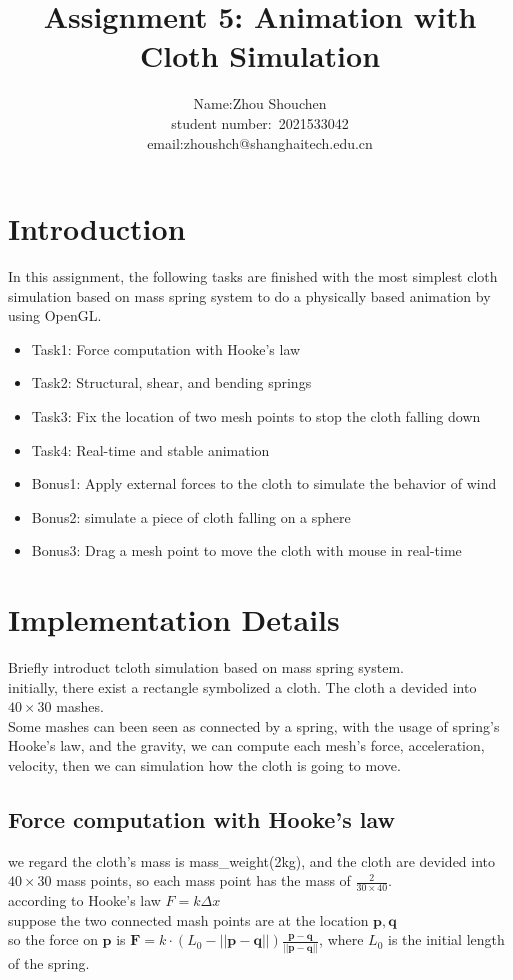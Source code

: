 \documentclass[acmtog]{acmart}
\title{Assignment 5: {Animation with Cloth Simulation}}
\author{Name:\quad Zhou Shouchen  \\ student number:\ 2021533042
\\email:\quad zhoushch@shanghaitech.edu.cn}
\begin{document}
\maketitle

\vspace*{2 ex}

\section{Introduction}
In this assignment, the following tasks are finished with the most simplest cloth simulation based on mass spring system to do a physically based animation by using OpenGL.
\begin{itemize}
\item Task1: Force computation with Hooke's law
\item Task2: Structural, shear, and bending springs
\item Task3: Fix the location of two mesh points to stop the cloth falling down
\item Task4: Real-time and stable animation
\item Bonus1: Apply external forces to the cloth to simulate the behavior of wind
\item Bonus2: simulate a piece of cloth falling on a sphere
\item Bonus3: Drag a mesh point to move the cloth with mouse in real-time
\end{itemize}

\section{Implementation Details}
Briefly introduct tcloth simulation based on mass spring system.\\
initially, there exist a rectangle symbolized a cloth. The cloth a devided into $40 \times 30$ mashes.\\
Some mashes can been seen as connected by a spring, with the usage of spring's Hooke's law, and the gravity, we can
compute each mesh's force, acceleration, velocity, then we can simulation how the cloth is going to move.\\

\subsection{Force computation with Hooke's law}
we regard the cloth's mass is mass\_weight(2kg), and the cloth are devided into $40 \times 30$ mass points, so each mass point has the 
mass of $\frac{2}{30\times 40}$.\\
according to Hooke's law $F=k\Delta x$\\
suppose the two connected mash points are at the location $\mathbf{p}, \mathbf{q}$\\
so the force on $\mathbf{p}$ is $\mathbf{F} = k\cdot(L_0 - ||\mathbf{p} - \mathbf{q}||) \frac{\mathbf{p} - \mathbf{q}}{||\mathbf{p} - \mathbf{q}||}$,
where $L_0$ is the initial length of the spring.\\
\end{document}
